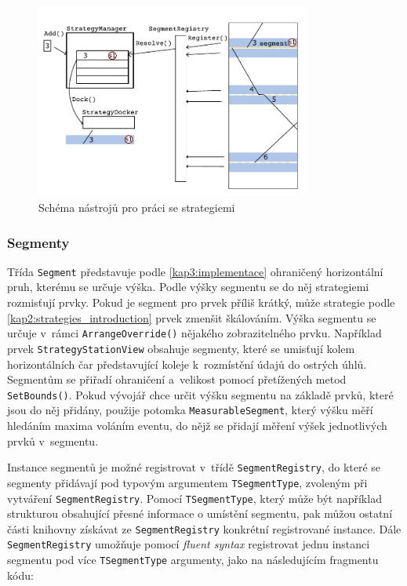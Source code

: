 \begin{figure}[!hbt]
	\centering	
	\includegraphics[width=0.8\textwidth]{../img/kap4_gtttg-core-strategies-tools}
	\caption{Schéma nástrojů pro práci se strategiemi}
	\label{fig:kap4:gttg-strategy_tools_schema}
\end{figure}

\subsubsection*{Segmenty}
\label{kap4:segments}
Třída \texttt{Segment} představuje podle \ref{kap3:implementace} ohraničený horizontální pruh, kterému se určuje výška. Podle výšky segmentu se do něj strategiemi rozmisťují prvky. Pokud je segment pro prvek příliš krátký, může strategie podle \ref{kap2:strategies_introduction} prvek zmenšit škálováním. Výška segmentu se určuje v~rámci \texttt{ArrangeOverride()} nějakého zobrazitelného prvku. Například prvek \texttt{StrategyStationView} obsahuje segmenty, které se umisťují kolem horizontálních čar představující koleje k~rozmístění údajů do ostrých úhlů. Segmentům se přiřadí ohraničení a~velikost pomocí přetížených metod \texttt{SetBounds()}. Pokud vývojář chce určit výšku segmentu na základě prvků, které jsou do něj přidány, použije potomka \texttt{MeasurableSegment}, který výšku měří hledáním maxima voláním eventu, do nějž se přidají měření výšek jednotlivých prvků v~segmentu.

Instance segmentů je možné registrovat v~třídě \texttt{SegmentRegistry}, do které se segmenty přidávají pod typovým argumentem \texttt{TSegmentType}, zvoleným při vytváření \texttt{SegmentRegistry}. Pomocí \texttt{TSegmentType}, který může být například strukturou obsahující přesné informace o umístění segmentu, pak můžou ostatní části knihovny získávat ze \texttt{SegmentRegistry} konkrétní registrované instance. Dále \texttt{SegmentRegistry} umožňuje pomocí \textit{fluent syntax} registrovat jednu instanci segmentu pod více \texttt{TSegmentType} argumenty, jako na následujícím fragmentu kódu:

